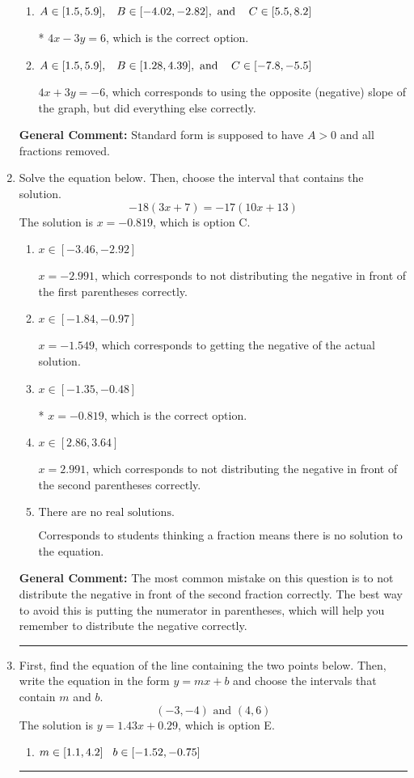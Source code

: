 \documentclass{extbook}[14pt]
\newcommand{\litem}[1]{\item #1

\rule{\textwidth}{0.4pt}}
\begin{document}
\begin{enumerate}
{\begin{enumerate}[label=\Alph*.]
 $-4x + 3y = -6$, which corresponds to not making $A$ positive (by multiplying the equation by $-1$).
\item \( A \in [1.5, 5.9], \hspace{3mm} B \in [-4.02, -2.82], \text{ and } \hspace{3mm} C \in [5.5, 8.2] \)

* $4x - 3y = 6$, which is the correct option.
\item \( A \in [1.5, 5.9], \hspace{3mm} B \in [1.28, 4.39], \text{ and } \hspace{3mm} C \in [-7.8, -5.5] \)

 $4x + 3y = -6$, which corresponds to using the opposite (negative) slope of the graph, but did everything else correctly.
\end{enumerate}

\textbf{General Comment:} Standard form is supposed to have $A > 0$ and all fractions removed.
}
\litem{
Solve the equation below. Then, choose the interval that contains the solution.
\[ -18(3x + 7) = -17(10x + 13) \]The solution is \( x = -0.819 \), which is option C.\begin{enumerate}[label=\Alph*.]
\item \( x \in [-3.46, -2.92] \)

$x = -2.991$, which corresponds to not distributing the negative in front of the first parentheses correctly.
\item \( x \in [-1.84, -0.97] \)

$x = -1.549$, which corresponds to getting the negative of the actual solution.
\item \( x \in [-1.35, -0.48] \)

* $x = -0.819$, which is the correct option.
\item \( x \in [2.86, 3.64] \)

$x = 2.991$, which corresponds to not distributing the negative in front of the second parentheses correctly.
\item \( \text{There are no real solutions.} \)

Corresponds to students thinking a fraction means there is no solution to the equation.
\end{enumerate}

\textbf{General Comment:} The most common mistake on this question is to not distribute the negative in front of the second fraction correctly. The best way to avoid this is putting the numerator in parentheses, which will help you remember to distribute the negative correctly.
}
\litem{
First, find the equation of the line containing the two points below. Then, write the equation in the form $ y=mx+b $ and choose the intervals that contain $m$ and $b$.
\[ (-3, -4) \text{ and } (4, 6) \]The solution is \( y = 1.43x + 0.29 \), which is option E.\begin{enumerate}[label=\Alph*.]
\item \( m \in [1.1, 4.2] \hspace*{3mm} b \in [-1.52, -0.75] \)


\end{enumerate}}
\end{enumerate}
\end{document}

